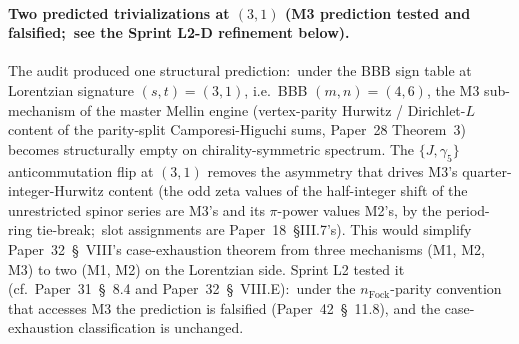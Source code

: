\documentclass[11pt]{article}
\begin{document}
\paragraph{Two predicted trivializations at $(3, 1)$ (M3 prediction
tested and falsified;\ see the Sprint L2-D refinement below).}
The audit produced one structural prediction:\
under the BBB sign table at Lorentzian signature $(s, t) = (3, 1)$,
i.e.\ BBB $(m, n) = (4, 6)$, the M3 sub-mechanism
of the master Mellin engine (vertex-parity Hurwitz / Dirichlet-$L$
content of the parity-split Camporesi-Higuchi sums, Paper~28 Theorem~3)
becomes structurally empty on chirality-symmetric spectrum.  The
$\{J, \gamma_5\}$ anticommutation flip at $(3, 1)$ removes the
asymmetry that drives M3's quarter-integer-Hurwitz content (the
odd zeta values of the half-integer shift of the unrestricted spinor
series are M3's and its $\pi$-power values M2's, by the period-ring
tie-break;\ slot assignments
are Paper~18~\S III.7's).  This would
simplify Paper~32~\S~VIII's case-exhaustion theorem from three
mechanisms (M1, M2, M3) to two (M1, M2) on the Lorentzian side.
Sprint L2 tested it (cf.~Paper~31~\S~8.4 and Paper~32~\S~VIII.E):\
under the $n_{\mathrm{Fock}}$-parity convention that accesses M3 the
prediction is falsified (Paper~42~\S~11.8), and the case-exhaustion
classification is unchanged.
\end{document}
